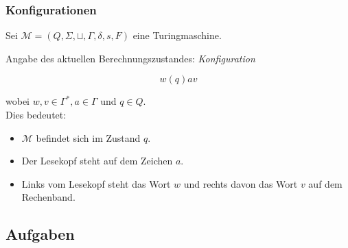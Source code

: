 \begin{frame}
\frametitle{Konfigurationen}
Sei $\mathcal{M} =(Q,\Sigma, \sqcup, \Gamma,\delta,s,F)$ eine Turingmaschine.

Angabe des aktuellen Berechnungszustandes: \emph{Konfiguration}

$$w(q)av$$ 

wobei $w,v \in \Gamma^*, a \in \Gamma$ und $q\in Q$. \\

Dies bedeutet:

\begin{itemize}
	\item $\mathcal{M}$ befindet sich im Zustand $q$.
	\item Der Lesekopf steht auf dem Zeichen $a$.
	\item Links vom Lesekopf steht das Wort $w$ und rechts davon das Wort $v$ auf dem Rechenband.
\end{itemize}
\end{frame}

\subsection{Aufgaben}

